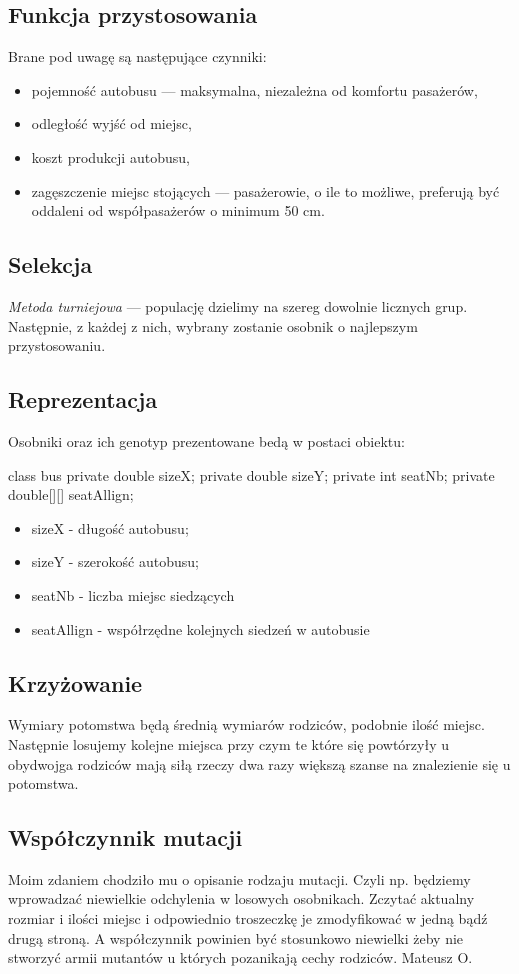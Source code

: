 \documentclass[10pt,a4paper]{article}
\begin{document}
\subsection{Funkcja przystosowania}
Brane pod uwagę są następujące czynniki:
\begin{itemize}
    \item pojemność autobusu --- maksymalna, niezależna od komfortu pasażerów,
    \item odległość wyjść od miejsc,
    \item koszt produkcji autobusu,
    \item zagęszczenie miejsc stojących --- pasażerowie, o ile to możliwe,
      preferują być oddaleni od współpasażerów o minimum 50 cm.
\end{itemize}


\subsection{Selekcja}
\emph{Metoda turniejowa} --- populację dzielimy na szereg dowolnie licznych
grup. Następnie, z każdej z nich, wybrany zostanie osobnik o najlepszym
przystosowaniu.


\subsection{Reprezentacja} 
Osobniki oraz ich genotyp prezentowane bedą w postaci obiektu:\\

\begin{SmallVerbatim}
    class bus{
	    private double sizeX;
	    private double sizeY;
	    private int seatNb;
	    private double[][] seatAllign;
    }
\end{SmallVerbatim}

\begin{itemize}
	\item sizeX - długość autobusu;
	\item sizeY - szerokość autobusu;
	\item seatNb - liczba miejsc siedzących
	\item seatAllign - współrzędne kolejnych siedzeń w autobusie
\end{itemize}
	

\subsection{Krzyżowanie}
Wymiary potomstwa będą średnią wymiarów rodziców, podobnie ilość miejsc.
Następnie losujemy kolejne miejsca przy czym te które się powtórzyły u obydwojga
rodziców mają siłą rzeczy dwa razy większą szanse na znalezienie się u
potomstwa.

\subsection{Współczynnik mutacji}
Moim zdaniem chodziło mu o opisanie rodzaju mutacji. Czyli np. będziemy
wprowadzać niewielkie odchylenia w losowych osobnikach. Zczytać aktualny
rozmiar i ilości miejsc i odpowiednio troszeczkę je zmodyfikować w jedną bądź
drugą stroną.  A współczynnik powinien być stosunkowo niewielki żeby nie
stworzyć armii mutantów u których pozanikają cechy rodziców. Mateusz O. 
\end{document}
